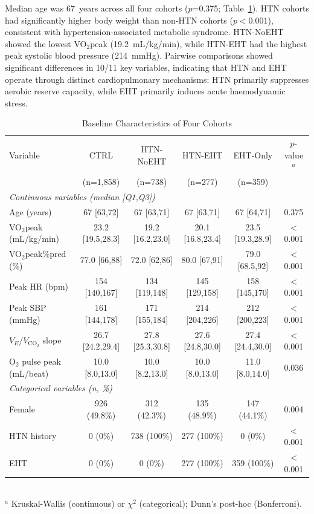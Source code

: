 \documentclass[12pt, a4paper]{article}
\begin{document}
Median age was 67~years across all four cohorts ($p$=0.375;
Table~\ref{tab:table1_en}). HTN cohorts had significantly higher body weight
than non-HTN cohorts ($p<0.001$), consistent with hypertension-associated
metabolic syndrome. HTN-NoEHT showed the lowest VO$_2$peak
(19.2~mL/kg/min), while HTN-EHT had the highest peak systolic blood pressure
(214~mmHg). Pairwise comparisons showed significant differences in 10/11 key
variables, indicating that HTN and EHT operate through distinct cardiopulmonary
mechanisms: HTN primarily suppresses aerobic reserve capacity, while EHT
primarily induces acute haemodynamic stress.

\begin{table}[htbp]
\centering
\small
\caption{Baseline Characteristics of Four Cohorts}
\label{tab:table1_en}
\begin{tabular}{lccccc}
\toprule
Variable & CTRL & HTN-NoEHT & HTN-EHT & EHT-Only & $p$-value$^a$ \\
 & (n=1,858) & (n=738) & (n=277) & (n=359) & \\
\midrule
\multicolumn{6}{l}{\textit{Continuous variables (median [Q1,Q3])}} \\
Age (years) & 67 [63,72] & 67 [63,71] & 67 [63,71] & 67 [64,71] & 0.375 \\
VO$_2$peak (mL/kg/min) & 23.2 [19.5,28.3] & 19.2 [16.2,23.0] & 20.1 [16.8,23.4] & 23.5 [19.3,28.9] & $<$0.001 \\
VO$_2$peak\%pred (\%) & 77.0 [66,88] & 72.0 [62,86] & 80.0 [67,91] & 79.0 [68.5,92] & $<$0.001 \\
Peak HR (bpm) & 154 [140,167] & 134 [119,148] & 145 [129,158] & 158 [145,170] & $<$0.001 \\
Peak SBP (mmHg) & 161 [144,178] & 171 [155,184] & 214 [204,226] & 212 [200,223] & $<$0.001 \\
$V_E/V_{\text{CO}_2}$ slope & 26.7 [24.2,29.4] & 27.8 [25.3,30.8] & 27.6 [24.8,30.0] & 27.4 [24.4,30.0] & $<$0.001 \\
O$_2$ pulse peak (mL/beat) & 10.0 [8.0,13.0] & 10.0 [8.2,13.0] & 10.0 [8.0,13.0] & 11.0 [8.0,14.0] & 0.036 \\
\midrule
\multicolumn{6}{l}{\textit{Categorical variables (n, \%)}} \\
Female & 926 (49.8\%) & 312 (42.3\%) & 135 (48.9\%) & 147 (44.1\%) & 0.004 \\
HTN history & 0 (0\%) & 738 (100\%) & 277 (100\%) & 0 (0\%) & $<$0.001 \\
EHT & 0 (0\%) & 0 (0\%) & 277 (100\%) & 359 (100\%) & $<$0.001 \\
\bottomrule
\end{tabular}
\\[1ex]
{\footnotesize $^a$ Kruskal-Wallis (continuous) or $\chi^2$ (categorical); Dunn's post-hoc (Bonferroni).}
\end{table}
\end{document}

